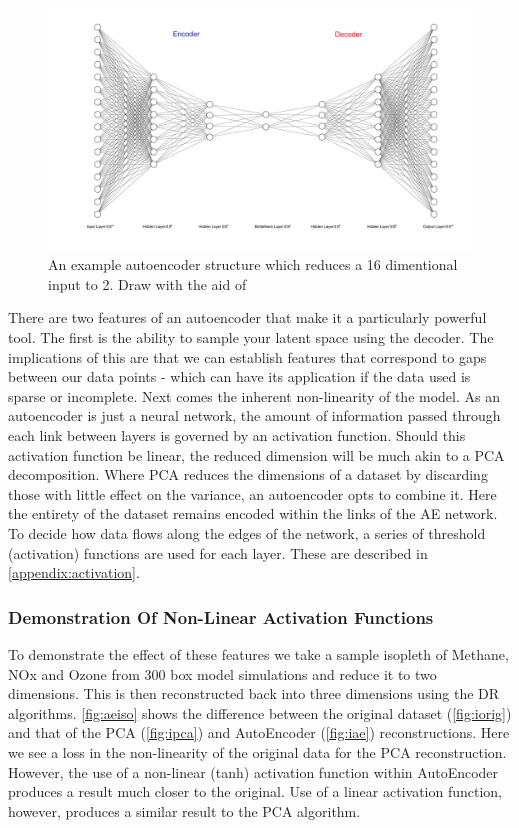 \begin{figure}[H]
\includegraphics[width=\textwidth]{4fig/ae.pdf}
\caption{An example autoencoder structure which reduces a 16 dimentional input to 2. Draw with the aid of \citep{drawae}}
\end{figure}



There are two features of an autoencoder that make it a particularly powerful tool. The first is the ability to sample your latent space using the decoder. The implications of this are that we can establish features that correspond to gaps between our data points - which can have its application if the data used is sparse or incomplete. Next comes the inherent non-linearity of the model. As an autoencoder is just a neural network, the amount of information passed through each link between layers is governed by an activation function. Should this activation function be linear, the reduced dimension will be much akin to a PCA decomposition. Where PCA reduces the dimensions of a dataset by discarding those with little effect on the variance, an autoencoder opts to combine it. Here the entirety of the dataset remains encoded within the links of the AE network. To decide how data flows along the edges of the network, a series of threshold (activation) functions are used for each layer. These are described in \autoref{appendix:activation}.



\subsubsection{Demonstration Of Non-Linear Activation Functions}

To demonstrate the effect of these features we take a sample isopleth of Methane, NOx and Ozone from 300 box model simulations and reduce it to two dimensions. This is then reconstructed back into three dimensions using the DR algorithms.
\autoref{fig:aeiso} shows the difference between the original dataset (\autoref{fig:iorig}) and that of the PCA (\autoref{fig:ipca}) and AutoEncoder (\autoref{fig:iae}) reconstructions. Here we see a loss in the non-linearity of the original data for the PCA reconstruction. However, the use of a non-linear (tanh) activation function within AutoEncoder produces a result much closer to the original. Use of a linear activation function, however, produces a similar result to the PCA algorithm.

